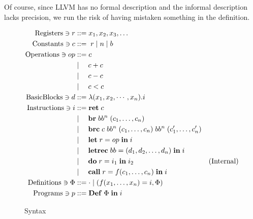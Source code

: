 \documentclass[a4paper, oneside, 10pt, draft]{memoir}
\begin{document}
Of course, since LLVM has no formal description and the informal
description lacks precision\cite{lattner.ea:2009:llvm-ref}, we run the
risk of having mistaken something in the definition.

\newcommand{\registers}{\mathrm{Registers}}
\newcommand{\constants}{\mathrm{Constants}}
\newcommand{\operations}{\mathrm{Operations}}
\newcommand{\instructions}{\mathrm{Instructions}}
\newcommand{\programs}{\mathrm{Programs}}
\newcommand{\definitions}{\mathrm{Definitions}}
\newcommand{\basicblocks}{\mathrm{Basic Blocks}}
\newcommand{\iret}[1]{\mathbf{ret} \; #1}

\newcommand{\ibr}[2]{\mathbf{br} \; #1 \; #2}
\newcommand{\ibrc}[5]{\mathbf{brc} \; #1 \; #2 \; #3 \; #4 \; #5}
\newcommand{\ilet}[3]{\mathbf{let} \; #1 = #2 \; \mathbf{in} \; #3}
\newcommand{\iletrec}[3]{\mathbf{letrec} \; #1 = #2 \; \mathbf{in} \; #3}
\newcommand{\ido}[3]{\mathbf{do} \; #1 = #2 \; \mathbf{in} \; #3}
\newcommand{\icall}[4]{\mathbf{call} \; #1 = #2 #3\; \mathbf{in} \;
  #4}
\newcommand{\ipgm}[2]{\mathbf{Def} \; #1 \; \mathbf{in} \; #2}
\begin{figure}
  \begin{align*}
    \registers \ni r & ::= x_1, x_2, x_3, \dotsc\\
    \constants \ni c & ::= \; r \bor \nat \bor \bool \\
    \operations \ni op & ::= c \\
                       & \bor \quad c + c \\
                       & \bor \quad c - c \\
                       & \bor \quad c < c \\
   \basicblocks \ni d  & ::= \lambda (x_1, x_2, \cdots, x_n) . i\\
   \instructions \ni i & ::= \iret{c} \\
                       & \bor \quad \ibr{bb^n}{(c_1, \dotsc, c_n)} \\
                       & \bor \quad \ibrc{c}{bb^n}{(c_1, \dotsc, c_n)}{bb^n}{(c'_1, \dotsc, c'_n)}\\
                       & \bor \quad \ilet{r}{op}{i} \\
                       & \bor \quad \iletrec{bb}{(d_1, d_2, \dotsc, d_n)}{i} \\
                       & \bor \quad \ido{r}{i_1}{i_2} &
                       (\text{Internal})\\
                       & \bor \quad \icall{r}{f}{(c_1, \dotsc,
                         c_n)}{i}\\
    \definitions \ni \Phi & ::= \cdot \bor (f(x_1, \dotsc, x_n) = i, \Phi)\\
    \programs \ni p & ::= \ipgm{\Phi}{i}
  \end{align*}
  \caption{Syntax}
  \label{fig:syntax}
\end{figure}
\end{document}
